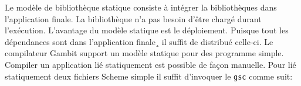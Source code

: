 Le modèle de bibliothèque statique consiste à intégrer la bibliothèques
dans l'application finale. La bibliothèque n'a pas besoin d'être chargé
durant l'exécution. L'avantage du modèle statique est le déploiement.
Puisque tout les dépendances sont dans l'application finale¸ il suffit
de distribué celle-ci. Le compilateur Gambit support un modèle statique
pour des programme simple. Compiler un application lié statiquement est
possible de façon manuelle. Pour lié statiquement deux fichiers Scheme
simple il suffit d'invoquer le \texttt{gsc} comme suit:

\begin{center}
\end{center}



